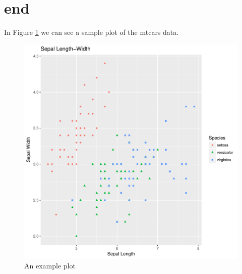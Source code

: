 \documentclass{article}\usepackage[]{graphicx}\usepackage[]{color}
\makeatletter
\def\maxwidth{ %
  \ifdim\Gin@nat@width>\linewidth
    \linewidth
  \else
    \Gin@nat@width
  \fi
}
\newenvironment{knitrout}{}{} %
\makeatother
\begin{document}
\section{end}





In Figure \ref{fig:ex2} we can see a sample plot of the mtcars data.

\begin{figure}
\begin{knitrout}
\color{fgcolor}

{\centering \includegraphics[width=\maxwidth]{figures/plots-unnamed-chunk-1-1} 

}



\end{knitrout}
\caption{An example plot}
\label{fig:ex2}
\end{figure}




\printbibliography
\end{document}
